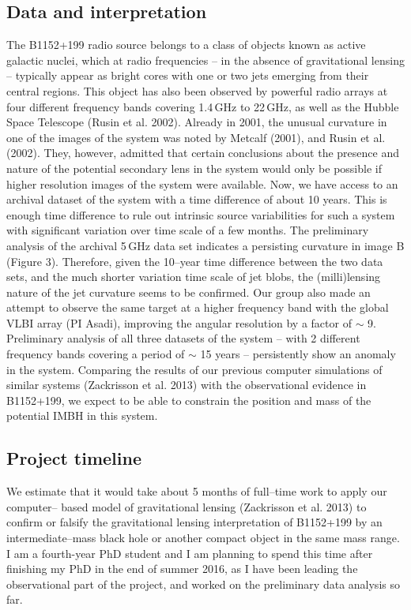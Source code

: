\documentclass[a4paper, 11pt]{article}
\begin{document}
\subsection{Data and interpretation}
The B1152+199 radio source belongs to a class of objects known as active galactic nuclei, which at radio frequencies -- in the absence of gravitational lensing -- typically appear as bright cores with one or two jets emerging from their central regions. This object has also been observed by powerful radio arrays at four different frequency bands covering 1.4\,GHz to 22\,GHz, as well as the Hubble Space Telescope (Rusin et al. 2002). Already in 2001, the unusual curvature in one of the images of the system was noted by Metcalf (2001), and Rusin et al. (2002). They, however, admitted that certain conclusions about the presence and nature of the potential secondary lens in the system would only be possible if higher resolution images of the system were available. Now, we have access to an archival dataset of the system with a time difference of about 10 years. This is enough time difference to rule out intrinsic source variabilities for such a system with significant variation over time scale of a few months. The preliminary analysis of the archival 5\,GHz data set indicates a persisting curvature in image B (Figure 3). Therefore, given the 10--year time difference between the two data sets, and the much shorter variation time scale of jet blobs, the (milli)lensing nature of the jet curvature seems to be confirmed. Our group also made an attempt to observe the same target at a higher frequency band with the global VLBI array (PI Asadi), improving the angular resolution by a factor of $\sim$ 9. Preliminary analysis of all three datasets of the system -- with 2 different frequency bands covering a period of $\sim$ 15 years -- persistently show an anomaly in the system. Comparing the results of our previous computer simulations of similar systems (Zackrisson et al. 2013) with the observational evidence in B1152+199, we expect to be able to constrain the position and mass of the potential IMBH in this system.

\subsection{Project timeline}
We estimate that it would take about 5 months of full--time work to apply our computer-- based model of gravitational lensing (Zackrisson et al. 2013) to confirm or falsify the gravitational lensing interpretation of B1152+199 by an intermediate--mass black hole or another compact object in the same mass range. I am a fourth-year PhD student and I am planning to spend this time after finishing my PhD in the end of summer 2016, as I have been leading the observational part of the project, and worked on the preliminary data analysis so far.
\end{document}
